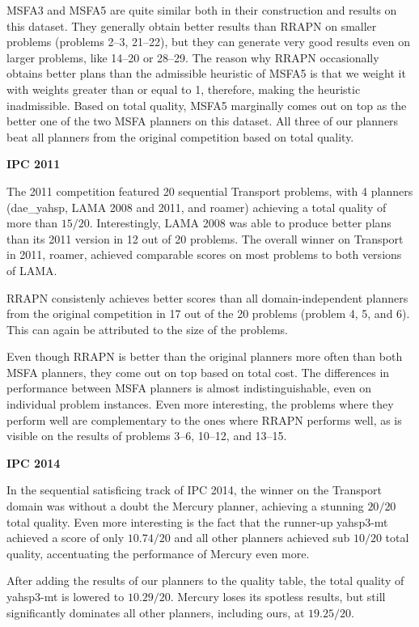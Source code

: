 \documentclass[a0paper,fontscale=0.285]{baposter} %
\begin{document}
\begin{poster}
{\begin{multicols}{3}
MSFA3 and MSFA5 are quite similar both in their construction and results on this dataset.
They generally obtain better results than RRAPN on smaller problems
(problems 2--3, 21--22),
but they can generate very good results even on larger problems,
like 14--20 or 28--29.
The reason why RRAPN occasionally obtains better plans than the
admissible heuristic of MSFA5 is that we weight it
with weights greater than or equal to 1,
therefore, making the heuristic inadmissible.
Based on total quality, MSFA5 marginally comes out on top as the better one of the two MSFA planners on this dataset.
All three of our planners beat all planners from the original competition based on total quality.

\textbf{IPC 2011}

The 2011 competition featured 20 sequential Transport problems,
with 4 planners (dae\_yahsp, LAMA 2008 and 2011, and roamer) achieving a total quality of more than $15/20$.
Interestingly, LAMA 2008 was able to produce better plans than its 2011 version in 12 out of 20 problems. The overall winner on Transport in 2011, roamer, achieved comparable scores on most problems to both versions of LAMA.

RRAPN consistenly achieves better scores than all domain-independent planners from the original competition in 17 out of the 20 problems (problem 4, 5, and 6). This can again be attributed to the size
of the problems.

Even though RRAPN is better than the original planners more often than both MSFA planners,
they come out on top based on total cost.
The differences in performance between MSFA planners
is almost indistinguishable, even on individual problem instances.
Even more interesting, the problems
where they perform well are complementary to the ones where RRAPN performs well,
as is visible on the results of problems 3--6, 10--12, and 13--15.

\textbf{IPC 2014}

In the sequential satisficing track of IPC 2014, the winner on the Transport domain
was without a doubt the Mercury planner, achieving
a stunning $20/20$ total quality. Even more interesting is the fact that
the runner-up yahsp3-mt achieved a score of only $10.74/20$
and all other planners achieved sub $10/20$ total quality,
accentuating the performance of Mercury even more.

After adding the results of our planners to the quality table,
the total quality of yahsp3-mt is lowered to $10.29/20$.
Mercury loses its spotless results, but still significantly dominates all
other planners, including ours, at $19.25/20$.


\end{multicols}}
\end{poster}
\end{document}

